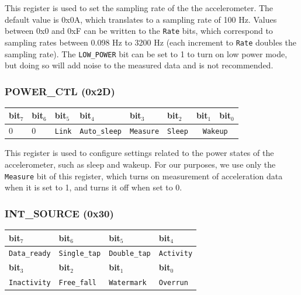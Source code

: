 \documentclass[11pt, twoside, pdftex]{article}
\begin{document}
This register is used to set the sampling rate of the the accelerometer. The default value is 0x0A, which translates to a sampling rate of 100 Hz. Values between 0x0 and 0xF can be written to the \texttt{Rate} bits, which correspond to sampling rates between 0.098 Hz to 3200 Hz (each increment to \texttt{Rate} doubles the sampling rate). The \texttt{LOW\_POWER} bit can be set to 1 to turn on low power mode, but doing so will add noise to the measured data and is not recommended.

\subsubsection{POWER\_CTL (0x2D)}

\begin{table}[H]
    \centering
    \begin{tabular}{|l|l|l|l|l|l|l|l|}
        \hline
            \textbf{bit$_7$}
            & \textbf{bit$_6$}
            & \textbf{bit$_5$}
            & \textbf{bit$_4$}
            & \textbf{bit$_3$}
            & \textbf{bit$_2$}
            & \textbf{bit$_1$}
            & \textbf{bit$_0$}
        \\\hline
            0
            & 0
            & \texttt{Link}
            & \texttt{Auto\_sleep}
            & \texttt{Measure}
            & \texttt{Sleep}
            & \multicolumn{2}{|c|}{\texttt{Wakeup}}
        \\\hline
    \end{tabular}
\end{table}
\vspace{-10pt}

This register is used to configure settings related to the power states of the accelerometer, such as sleep and wakeup. For our purposes, we use only the \texttt{Measure} bit of this register, which turns on measurement of acceleration data when it is set to 1, and turns it off when set to 0.

\subsubsection{INT\_SOURCE (0x30)}

\begin{table}[H]
    \centering
    \begin{tabular}{|l|l|l|l|}
        \hline
            \textbf{bit$_7$}
            & \textbf{bit$_6$}
            & \textbf{bit$_5$}
            & \textbf{bit$_4$}
        \\\hline
            \texttt{Data\_ready}
            & \texttt{Single\_tap}
            & \texttt{Double\_tap}
            & \texttt{Activity}
        \\\hline
            \textbf{bit$_3$}
            & \textbf{bit$_2$}
            & \textbf{bit$_1$}
            & \textbf{bit$_0$}
        \\\hline
            \texttt{Inactivity}
            & \texttt{Free\_fall}
            & \texttt{Watermark}
            & \texttt{Overrun}
        \\\hline
    \end{tabular}
\end{table}
\end{document}
